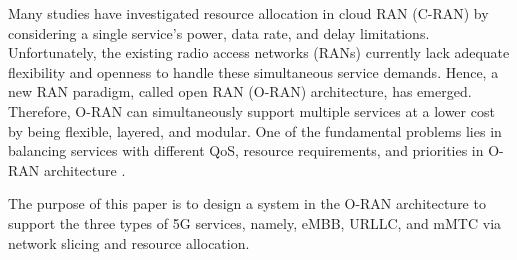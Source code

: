 \documentclass[lettersize,journal]{IEEEtran}
\begin{document}
Many studies have investigated resource allocation in cloud RAN (C-RAN) by considering a single service's power, data rate, and delay limitations.
Unfortunately, the existing radio access networks (RANs) currently lack adequate flexibility and openness to handle these simultaneous service demands. 
Hence, a new RAN paradigm, called open RAN (O-RAN) architecture, has emerged.
Therefore, O-RAN can simultaneously support multiple services at a lower cost by being flexible, layered, and modular.  
One of the fundamental problems lies in balancing services with different QoS, resource requirements, and priorities in O-RAN architecture
 \cite{ORANArch, gavrilovska2020cloud, kazemifard2021minimum, shen2020ai}.  

The purpose of this paper is to design a system in the O-RAN architecture to support the three types of 5G services, namely, eMBB, URLLC, and mMTC via network slicing and resource allocation.
\vspace{-3mm}
\end{document}
